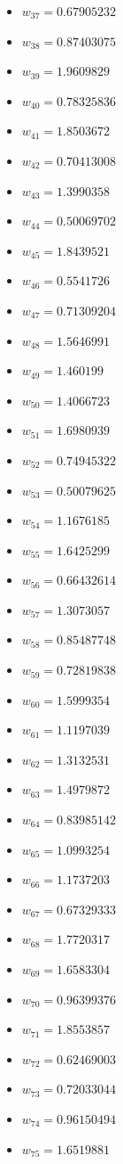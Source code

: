 \documentclass[11pt]{article}
\begin{document}
\begin{itemize}
\item $w_{37} = 0.67905232$
\item $w_{38} = 0.87403075$
\item $w_{39} = 1.9609829$
\item $w_{40} = 0.78325836$
\item $w_{41} = 1.8503672$
\item $w_{42} = 0.70413008$
\item $w_{43} = 1.3990358$
\item $w_{44} = 0.50069702$
\item $w_{45} = 1.8439521$
\item $w_{46} = 0.5541726$
\item $w_{47} = 0.71309204$
\item $w_{48} = 1.5646991$
\item $w_{49} = 1.460199$
\item $w_{50} = 1.4066723$
\item $w_{51} = 1.6980939$
\item $w_{52} = 0.74945322$
\item $w_{53} = 0.50079625$
\item $w_{54} = 1.1676185$
\item $w_{55} = 1.6425299$
\item $w_{56} = 0.66432614$
\item $w_{57} = 1.3073057$
\item $w_{58} = 0.85487748$
\item $w_{59} = 0.72819838$
\item $w_{60} = 1.5999354$
\item $w_{61} = 1.1197039$
\item $w_{62} = 1.3132531$
\item $w_{63} = 1.4979872$
\item $w_{64} = 0.83985142$
\item $w_{65} = 1.0993254$
\item $w_{66} = 1.1737203$
\item $w_{67} = 0.67329333$
\item $w_{68} = 1.7720317$
\item $w_{69} = 1.6583304$
\item $w_{70} = 0.96399376$
\item $w_{71} = 1.8553857$
\item $w_{72} = 0.62469003$
\item $w_{73} = 0.72033044$
\item $w_{74} = 0.96150494$
\item $w_{75} = 1.6519881$

\end{itemize}
\end{document}
